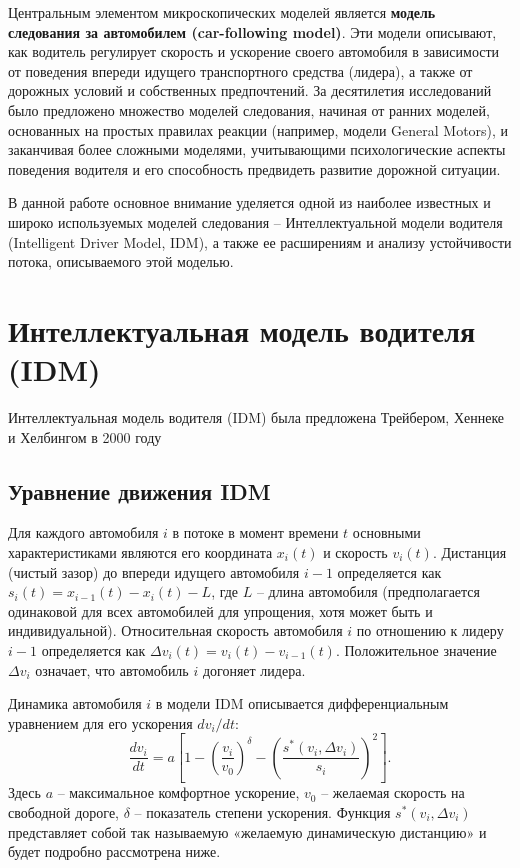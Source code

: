 \documentclass[12pt, a4paper]{article}
\begin{document}
Центральным элементом микроскопических моделей является \textbf{модель следования за автомобилем (car-following model)}. Эти модели описывают, как водитель регулирует скорость и ускорение своего автомобиля в зависимости от поведения впереди идущего транспортного средства (лидера), а также от дорожных условий и собственных предпочтений. За десятилетия исследований было предложено множество моделей следования, начиная от ранних моделей, основанных на простых правилах реакции (например, модели General Motors), и заканчивая более сложными моделями, учитывающими психологические аспекты поведения водителя и его способность предвидеть развитие дорожной ситуации.

В данной работе основное внимание уделяется одной из наиболее известных и широко используемых моделей следования – Интеллектуальной модели водителя (Intelligent Driver Model, IDM), а также ее расширениям и анализу устойчивости потока, описываемого этой моделью.

\section{Интеллектуальная модель водителя (IDM)}
\label{sec:idm_model}

Интеллектуальная модель водителя (IDM) была предложена Трейбером, Хеннеке и Хелбингом в 2000 году \cite{treiber2000idm}

\subsection{Уравнение движения IDM}
\label{subsec:idm_equation}

Для каждого автомобиля $i$ в потоке в момент времени $t$ основными характеристиками являются его координата $x_i(t)$ и скорость $v_i(t)$. Дистанция (чистый зазор) до впереди идущего автомобиля $i-1$ определяется как $s_i(t) = x_{i-1}(t) - x_i(t) - L$, где $L$ – длина автомобиля (предполагается одинаковой для всех автомобилей для упрощения, хотя может быть и индивидуальной). Относительная скорость автомобиля $i$ по отношению к лидеру $i-1$ определяется как $\Delta v_i(t) = v_i(t) - v_{i-1}(t)$. Положительное значение $\Delta v_i$ означает, что автомобиль $i$ догоняет лидера.

Динамика автомобиля $i$ в модели IDM описывается дифференциальным уравнением для его ускорения $dv_i/dt$:
\begin{equation}
\label{eq:idm_acceleration}
\frac{dv_i}{dt} = a \left[1 - \left(\frac{v_i}{v_0}\right)^\delta - \left( \frac{s^*(v_i, \Delta v_i)}{s_i} \right)^2 \right].
\end{equation}
Здесь $a$ – максимальное комфортное ускорение, $v_0$ – желаемая скорость на свободной дороге, $\delta$ – показатель степени ускорения. Функция $s^*(v_i, \Delta v_i)$ представляет собой так называемую «желаемую динамическую дистанцию» и будет подробно рассмотрена ниже.
\end{document}
